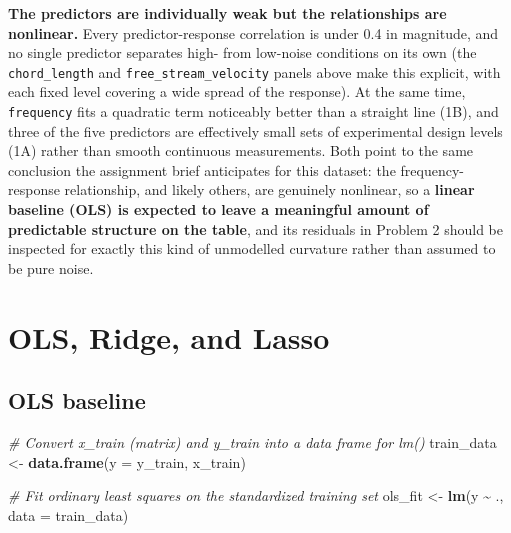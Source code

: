 \documentclass[
  11pt,
]{article}
\newenvironment{Shaded}{\begin{snugshade}}{\end{snugshade}}
\newcommand{\AttributeTok}[1]{\textcolor[rgb]{0.13,0.29,0.53}{#1}}
\newcommand{\CommentTok}[1]{\textcolor[rgb]{0.56,0.35,0.01}{\textit{#1}}}
\newcommand{\FunctionTok}[1]{\textcolor[rgb]{0.13,0.29,0.53}{\textbf{#1}}}
\newcommand{\NormalTok}[1]{#1}
\newcommand{\OtherTok}[1]{\textcolor[rgb]{0.56,0.35,0.01}{#1}}
\newcommand{\SpecialCharTok}[1]{\textcolor[rgb]{0.81,0.36,0.00}{\textbf{#1}}}
\begin{document}
\textbf{The predictors are individually weak but the relationships are
nonlinear.} Every predictor-response correlation is under 0.4 in
magnitude, and no single predictor separates high- from low-noise
conditions on its own (the \texttt{chord\_length} and
\texttt{free\_stream\_velocity} panels above make this explicit, with
each fixed level covering a wide spread of the response). At the same
time, \texttt{frequency} fits a quadratic term noticeably better than a
straight line (1B), and three of the five predictors are effectively
small sets of experimental design levels (1A) rather than smooth
continuous measurements. Both point to the same conclusion the
assignment brief anticipates for this dataset: the frequency-response
relationship, and likely others, are genuinely nonlinear, so a
\textbf{linear baseline (OLS) is expected to leave a meaningful amount
of predictable structure on the table}, and its residuals in Problem 2
should be inspected for exactly this kind of unmodelled curvature rather
than assumed to be pure noise.

\section{OLS, Ridge, and Lasso}\label{ols-ridge-and-lasso}

\subsection{OLS baseline}\label{ols-baseline}

\begin{Shaded}
\begin{Highlighting}[]
\CommentTok{\# Convert x\_train (matrix) and y\_train into a data frame for lm()}
\NormalTok{train\_data }\OtherTok{\textless{}{-}} \FunctionTok{data.frame}\NormalTok{(}\AttributeTok{y =}\NormalTok{ y\_train, x\_train)}

\CommentTok{\# Fit ordinary least squares on the standardized training set}
\NormalTok{ols\_fit }\OtherTok{\textless{}{-}} \FunctionTok{lm}\NormalTok{(y }\SpecialCharTok{\textasciitilde{}}\NormalTok{ ., }\AttributeTok{data =}\NormalTok{ train\_data)}
\end{Highlighting}
\end{Shaded}
\end{document}

